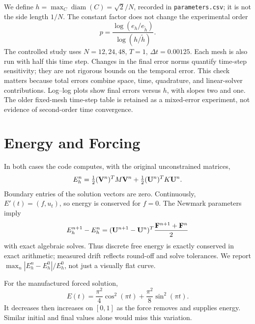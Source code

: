 We define \(h=\max_C\operatorname{diam}(C)=\sqrt{2}/N\), recorded in
\texttt{parameters.csv}; it is not the side length \(1/N\).
The constant factor does not change the experimental order
\[
 p=\frac{\log(e_h/e_{\tilde h})}{\log(h/\tilde h)}.
\]
The controlled study uses \(N=12,24,48\), \(T=1\), \(\Delta t=0.00125\).
Each mesh is also run with half this time step. Changes in the final error
norms quantify time-step sensitivity; they are not rigorous bounds on the
temporal error. This check matters because total errors combine space,
time, quadrature, and linear-solver contributions.
Log--log plots show final errors versus \(h\), with slopes two and one.
The older fixed-mesh time-step table is retained as a mixed-error experiment,
not evidence of second-order time convergence.

\section{Energy and Forcing}
In both cases the code computes, with the original unconstrained matrices,
\[
 E_h^n=\tfrac12(\mathbf{V}^n)^TM\mathbf{V}^n+
       \tfrac12(\mathbf{U}^n)^TK\mathbf{U}^n.
\]
Boundary entries of the solution vectors are zero. Continuously,
\(E'(t)=(f,u_t)\), so energy is conserved for \(f=0\).
The Newmark parameters imply
\[
 E_h^{n+1}-E_h^n
 =(\mathbf{U}^{n+1}-\mathbf{U}^n)^T
   \frac{\mathbf{F}^{n+1}+\mathbf{F}^n}{2}
\]
with exact algebraic solves. Thus discrete free energy is exactly conserved
in exact arithmetic; measured drift reflects round-off and solve tolerances.
We report \(\max_n|E_h^n-E_h^0|/E_h^0\), not just a visually flat curve.

For the manufactured forced solution,
\[
 E(t)=\frac{\pi^2}{4}\cos^2(\pi t)+\frac{\pi^2}{8}\sin^2(\pi t).
\]
It decreases then increases on \([0,1]\) as the force removes and supplies
energy. Similar initial and final values alone would miss this variation.
